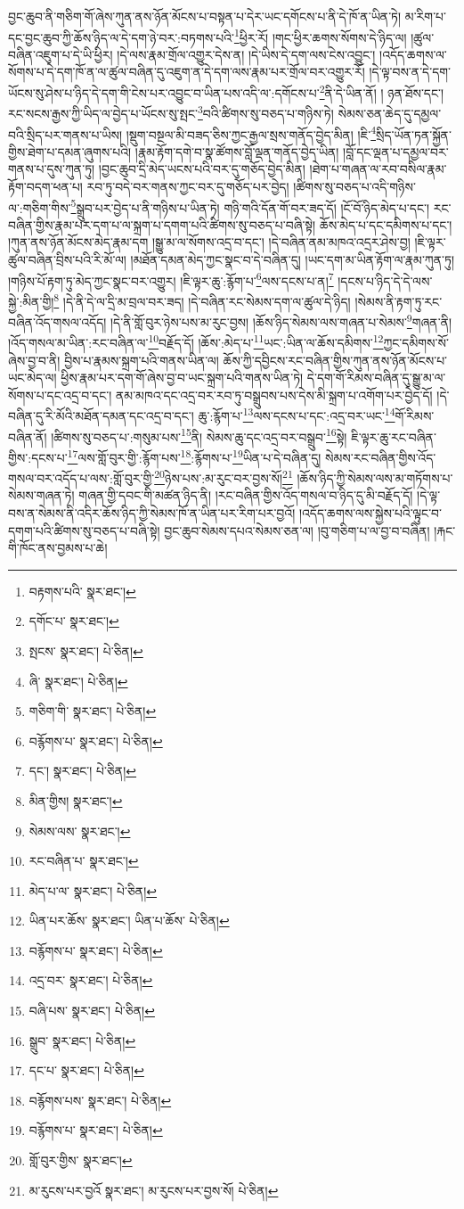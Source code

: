 བྱང་ཆུབ་ནི་གཅིག་གོ་ཞེས་ཀུན་ནས་ཉོན་མོངས་པ་བསྟན་པ་དེར་ཡང་དགོངས་པ་ནི་དེ་ཁོ་ན་ཡིན་ཏེ། མ་རིག་པ་དང་བྱང་ཆུབ་ཀྱི་ཆོས་ཉིད་ལ་དེ་དག་ཉེ་བར་:བཏགས་པའི་\footnote{བརྟགས་པའི་  སྣར་ཐང་། }ཕྱིར་རོ། །གང་ཕྱིར་ཆགས་སོགས་དེ་ཉིད་ལ། །ཚུལ་བཞིན་འཇུག་པ་དེ་ཡི་ཕྱིར། །དེ་ལས་རྣམ་གྲོལ་འགྱུར་དེས་ན། །དེ་ཡིས་དེ་དག་ལས་ངེས་འབྱུང་། །འདོད་ཆགས་ལ་སོགས་པ་དེ་དག་ཁོ་ན་ལ་ཚུལ་བཞིན་དུ་འཇུག་ན་དེ་དག་ལས་རྣམ་པར་གྲོལ་བར་འགྱུར་རོ། །དེ་ལྟ་བས་ན་དེ་དག་ཡོངས་སུ་ཤེས་པ་ཉིད་དེ་དག་གི་ངེས་པར་འབྱུང་བ་ཡིན་པས་འདི་ལ་:དགོངས་པ་\footnote{དགོང་པ་  སྣར་ཐང་། }ནི་དེ་ཡིན་ནོ། །
ཉན་ཐོས་དང་། རང་སངས་རྒྱས་ཀྱི་ཡིད་ལ་བྱེད་པ་ཡོངས་སུ་སྤང་\footnote{སྤངས་  སྣར་ཐང་།  པེ་ཅིན། }བའི་ཚིགས་སུ་བཅད་པ་གཉིས་ཏེ། སེམས་ཅན་ཆེད་དུ་དམྱལ་བའི་སྲིད་པར་གནས་པ་ཡིས། །སྡུག་བསྔལ་མི་བཟད་ཅིས་ཀྱང་རྒྱལ་སྲས་གནོད་བྱེད་མིན། །ཇི་\footnote{ཞི་  སྣར་ཐང་།  པེ་ཅིན། }སྲིད་ཡོན་ཏན་སྐྱོན་གྱིས་ཐེག་པ་དམན་ཞུགས་པའི། །རྣམ་རྟོག་དགེ་བ་སྣ་ཚོགས་བློ་ལྡན་གནོད་བྱེད་ཡིན། །བློ་དང་ལྡན་པ་དམྱལ་བར་གནས་པ་དུས་ཀུན་ཏུ། །བྱང་ཆུབ་དྲི་མེད་ཡངས་པའི་བར་དུ་གཅོད་བྱེད་མིན། །ཐེག་པ་གཞན་ལ་རབ་བསིལ་རྣམ་རྟོག་བདག་ཕན་པ། རབ་ཏུ་བདེ་བར་གནས་ཀྱང་བར་དུ་གཅོད་པར་བྱེད། །ཚིགས་སུ་བཅད་པ་འདི་གཉིས་ལ་:གཅིག་གིས་\footnote{གཅིག་གི་  སྣར་ཐང་།  པེ་ཅིན། }སྒྲུབ་པར་བྱེད་པ་ནི་གཉིས་པ་ཡིན་ཏེ། གཉི་གའི་དོན་གོ་བར་ཟད་དོ། །ངོ་བོ་ཉིད་མེད་པ་དང་། རང་བཞིན་གྱིས་རྣམ་པར་དག་པ་ལ་སྐྲག་པ་དགག་པའི་ཚིགས་སུ་བཅད་པ་བཞི་སྟེ། ཆོས་མེད་པ་དང་དམིགས་པ་དང་། །ཀུན་ནས་ཉོན་མོངས་མེད་རྣམ་དག །སྒྱུ་མ་ལ་སོགས་འདྲ་བ་དང་། །དེ་བཞིན་ནམ་མཁའ་འདྲར་ཤེས་བྱ། །ཇི་ལྟར་ཚུལ་བཞིན་བྲིས་པའི་རི་མོ་ལ། །མཐོན་དམན་མེད་ཀྱང་སྣང་བ་དེ་བཞིན་དུ། །ཡང་དག་མ་ཡིན་རྟོག་ལ་རྣམ་ཀུན་ཏུ། །གཉིས་པོ་རྟག་ཏུ་མེད་ཀྱང་སྣང་བར་འགྱུར། །ཇི་ལྟར་ཆུ་:རྙོག་པ་\footnote{བརྙོགས་པ་  སྣར་ཐང་།  པེ་ཅིན། }ལས་དངས་པ་ན།\footnote{དང་།  སྣར་ཐང་།  པེ་ཅིན། } །དངས་པ་ཉིད་དེ་དེ་ལས་སྐྱེ་:མིན་གྱི།\footnote{མིན་གྱིས།  སྣར་ཐང་། } །དེ་ནི་དེ་ལ་དྲི་མ་བྲལ་བར་ཟད། །དེ་བཞིན་རང་སེམས་དག་ལ་ཚུལ་དེ་ཉིད། །སེམས་ནི་རྟག་ཏུ་རང་བཞིན་འོད་གསལ་འདོད། །དེ་ནི་གློ་བུར་ཉེས་པས་མ་རུང་བྱས། །ཆོས་ཉིད་སེམས་ལས་གཞན་པ་སེམས་\footnote{སེམས་ལས་  སྣར་ཐང་། }གཞན་ནི། །འོད་གསལ་མ་ཡིན་:རང་བཞིན་ལ་\footnote{རང་བཞིན་པ་  སྣར་ཐང་། }བརྗོད་དོ། །ཆོས་:མེད་པ་\footnote{མེད་པ་ལ་  སྣར་ཐང་།  པེ་ཅིན། }ཡང་:ཡིན་ལ་ཆོས་དམིགས་\footnote{ཡིན་པར་ཆོས་  སྣར་ཐང་། ཡིན་པ་ཆོས་  པེ་ཅིན། }ཀྱང་དམིགས་སོ་ཞེས་བྱ་བ་ནི། བྱིས་པ་རྣམས་སྐྲག་པའི་གནས་ཡིན་ལ། ཆོས་ཀྱི་དབྱིངས་རང་བཞིན་གྱིས་ཀུན་ནས་ཉོན་མོངས་པ་ཡང་མེད་ལ། ཕྱིས་རྣམ་པར་དག་གོ་ཞེས་བྱ་བ་ཡང་སྐྲག་པའི་གནས་ཡིན་ཏེ། དེ་དག་གོ་རིམས་བཞིན་དུ་སྒྱུ་མ་ལ་སོགས་པ་དང་འདྲ་བ་དང་། ནམ་མཁའ་དང་འདྲ་བར་རབ་ཏུ་བསྒྲུབས་པས་དེས་མི་སྐྲག་པ་འགོག་པར་བྱེད་དོ། །དེ་བཞིན་དུ་རི་མོའི་མཐོན་དམན་དང་འདྲ་བ་དང་། ཆུ་:རྙོག་པ་\footnote{བརྙོགས་པ་  སྣར་ཐང་།  པེ་ཅིན། }ལས་དངས་པ་དང་:འདྲ་བར་ཡང་\footnote{འདྲ་བར་  སྣར་ཐང་།  པེ་ཅིན། }གོ་རིམས་བཞིན་ནོ། །ཚིགས་སུ་བཅད་པ་:གསུམ་པས་\footnote{བཞི་པས་  སྣར་ཐང་།  པེ་ཅིན། }ནི། སེམས་ཆུ་དང་འདྲ་བར་བསྒྲུབ་\footnote{སྒྲུབ་  སྣར་ཐང་།  པེ་ཅིན། }སྟེ། ཇི་ལྟར་ཆུ་རང་བཞིན་གྱིས་:དངས་པ་\footnote{དང་པ་  སྣར་ཐང་།  པེ་ཅིན། }ལས་གློ་བུར་གྱི་:རྙོག་པས་\footnote{བརྙོགས་པས་  སྣར་ཐང་།  པེ་ཅིན། }:རྙོགས་པ་\footnote{བརྙོགས་པ་  སྣར་ཐང་།  པེ་ཅིན། }ཡིན་པ་དེ་བཞིན་དུ། སེམས་རང་བཞིན་གྱིས་འོད་གསལ་བར་འདོད་པ་ལས་:གློ་བུར་གྱི་\footnote{གློ་བུར་གྱིས་  སྣར་ཐང་། }ཉེས་པས་:མ་རུང་བར་བྱས་སོ།\footnote{མ་རུངས་པར་བྱའོ  སྣར་ཐང་། མ་རུངས་པར་བྱས་སོ།  པེ་ཅིན། } །ཆོས་ཉིད་ཀྱི་སེམས་ལས་མ་གཏོགས་པ་སེམས་གཞན་ཏེ། གཞན་གྱི་དབང་གི་མཚན་ཉིད་ནི། །རང་བཞིན་གྱིས་འོད་གསལ་བ་ཉིད་དུ་མི་བརྗོད་དོ། །དེ་ལྟ་བས་ན་སེམས་ནི་འདིར་ཆོས་ཉིད་ཀྱི་སེམས་ཁོ་ན་ཡིན་པར་རིག་པར་བྱའོ། །འདོད་ཆགས་ལས་སྐྱེས་པའི་ལྟུང་བ་དགག་པའི་ཚིགས་སུ་བཅད་པ་བཞི་སྟེ། བྱང་ཆུབ་སེམས་དཔའ་སེམས་ཅན་ལ། །བུ་གཅིག་པ་ལ་བྱ་བ་བཞིན། །རྐང་གི་ཁོང་ནས་བྱམས་པ་ཆེ། 